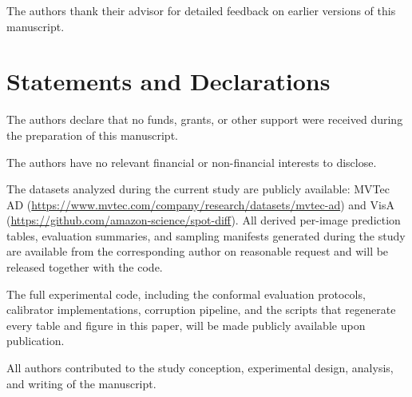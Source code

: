 The authors thank their advisor for detailed feedback on earlier versions of this manuscript.

\section*{Statements and Declarations}

The authors declare that no funds, grants, or other support were received during the preparation of this manuscript.

The authors have no relevant financial or non-financial interests to disclose.

The datasets analyzed during the current study are publicly available: MVTec AD (\url{https://www.mvtec.com/company/research/datasets/mvtec-ad}) and VisA (\url{https://github.com/amazon-science/spot-diff}). All derived per-image prediction tables, evaluation summaries, and sampling manifests generated during the study are available from the corresponding author on reasonable request and will be released together with the code.

The full experimental code, including the conformal evaluation protocols, calibrator implementations, corruption pipeline, and the scripts that regenerate every table and figure in this paper, will be made publicly available upon publication.

All authors contributed to the study conception, experimental design, analysis, and writing of the manuscript.
